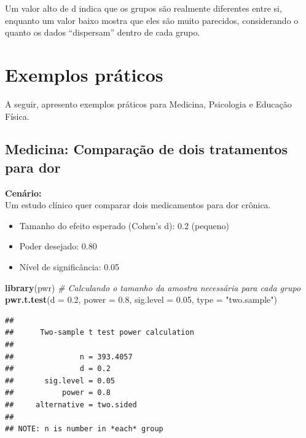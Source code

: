 \documentclass[
]{book}
\newenvironment{Shaded}{\begin{snugshade}}{\end{snugshade}}
\newcommand{\AttributeTok}[1]{\textcolor[rgb]{0.13,0.29,0.53}{#1}}
\newcommand{\CommentTok}[1]{\textcolor[rgb]{0.56,0.35,0.01}{\textit{#1}}}
\newcommand{\FloatTok}[1]{\textcolor[rgb]{0.00,0.00,0.81}{#1}}
\newcommand{\FunctionTok}[1]{\textcolor[rgb]{0.13,0.29,0.53}{\textbf{#1}}}
\newcommand{\NormalTok}[1]{#1}
\newcommand{\StringTok}[1]{\textcolor[rgb]{0.31,0.60,0.02}{#1}}
\providecommand{\tightlist}{%
  \setlength{\itemsep}{0pt}\setlength{\parskip}{0pt}}
\begin{document}
Um valor alto de d indica que os grupos são realmente diferentes entre si, enquanto um valor baixo mostra que eles são muito parecidos, considerando o quanto os dados ``dispersam'' dentro de cada grupo.

\section{Exemplos práticos}\label{exemplos-pruxe1ticos}

A seguir, apresento exemplos práticos para Medicina, Psicologia e Educação Física.

\subsection{Medicina: Comparação de dois tratamentos para dor}\label{medicina-comparauxe7uxe3o-de-dois-tratamentos-para-dor}

\textbf{Cenário:}\\
Um estudo clínico quer comparar dois medicamentos para dor crônica.

\begin{itemize}
\tightlist
\item
  Tamanho do efeito esperado (Cohen's d): 0.2 (pequeno)\\
\item
  Poder desejado: 0.80\\
\item
  Nível de significância: 0.05
\end{itemize}

\begin{Shaded}
\begin{Highlighting}[]
\FunctionTok{library}\NormalTok{(pwr)}
\CommentTok{\# Calculando o tamanho da amostra necessária para cada grupo}
\FunctionTok{pwr.t.test}\NormalTok{(}\AttributeTok{d =} \FloatTok{0.2}\NormalTok{, }\AttributeTok{power =} \FloatTok{0.8}\NormalTok{, }\AttributeTok{sig.level =} \FloatTok{0.05}\NormalTok{, }\AttributeTok{type =} \StringTok{"two.sample"}\NormalTok{)}
\end{Highlighting}
\end{Shaded}

\begin{verbatim}
## 
##      Two-sample t test power calculation 
## 
##               n = 393.4057
##               d = 0.2
##       sig.level = 0.05
##           power = 0.8
##     alternative = two.sided
## 
## NOTE: n is number in *each* group
\end{verbatim}
\end{document}
